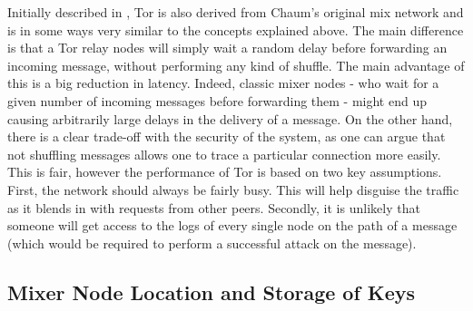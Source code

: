 \documentclass[11pt, a4paper]{article}
\begin{document}
        Initially described in \cite{tor}, Tor is also derived from Chaum's original mix network and is in some ways very similar to the concepts explained above.
        The main difference is that a Tor relay nodes will simply wait a random delay before forwarding an incoming message, without performing any kind of shuffle.
        The main advantage of this is a big reduction in latency.
        Indeed, classic mixer nodes - who wait for a given number of incoming messages before forwarding them - might end up causing arbitrarily large delays in the delivery of a message.
        On the other hand, there is a clear trade-off with the security of the system, as one can argue that not shuffling messages allows one to trace a particular connection more easily.
        This is fair, however the performance of Tor is based on two key assumptions.
        First, the network should always be fairly busy.
        This will help disguise the traffic as it blends in with requests from other peers.
        Secondly, it is unlikely that someone will get access to the logs of every single node on the path of a message (which would be required to perform a successful attack on the message).

        \subsection{Mixer Node Location and Storage of Keys}
\end{document}
